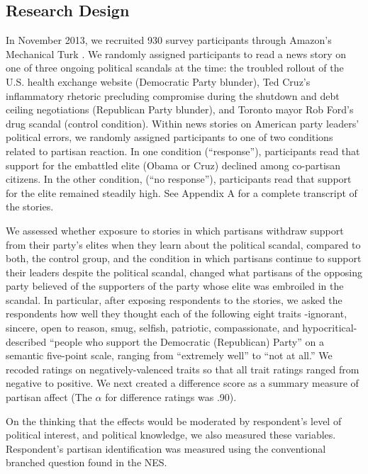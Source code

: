 \subsection*{Research Design}
In November 2013, we recruited 930 survey participants through Amazon's
Mechanical Turk \citep[see][]{BerinskyHuberLenz2012}. We randomly assigned participants to read a news story on one of three ongoing political scandals at the time: the troubled rollout of the U.S. health exchange website (Democratic Party blunder), Ted Cruz's inflammatory rhetoric precluding compromise during the shutdown and debt ceiling negotiations (Republican Party blunder), and Toronto mayor Rob Ford's drug scandal (control condition). Within news stories on American party leaders' political errors, we randomly assigned participants to one of two conditions related to partisan reaction. In one condition (``response''), participants read that support for the embattled elite (Obama or Cruz) declined among co-partisan citizens. In the other condition, (``no response''), participants read that support for the elite remained steadily high. See Appendix A for a complete transcript of the stories.

We assessed whether exposure to stories in which partisans withdraw support from
their party's elites when they learn about the political scandal, compared to
both, the control group, and the condition in which partisans continue to
support their leaders despite the political scandal, changed what partisans of
the opposing party believed of the supporters of the party whose elite was
embroiled in the scandal. In particular, after exposing respondents to the
stories, we asked the respondents how well they thought each of the following
eight traits -ignorant, sincere, open to reason, smug, selfish, patriotic,
compassionate, and hypocritical- described ``people who support the Democratic
(Republican) Party'' on a semantic five-point scale, ranging from ``extremely
well'' to ``not at all.'' We recoded ratings on negatively-valenced traits so
that all trait ratings ranged from negative to positive. We next created
a difference score as a summary measure of partisan affect (The $\alpha$ for
difference ratings was .90).

On the thinking that the effects would be moderated by respondent's level of
political interest, and political knowledge, we also measured these variables. 
Respondent's partisan identification was measured using the conventional
branched question found in the NES.
